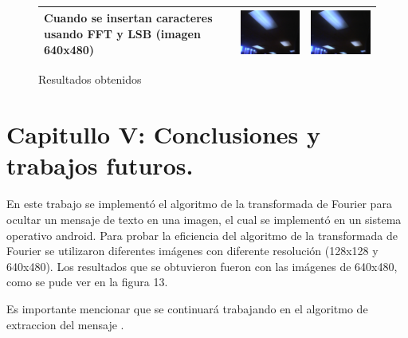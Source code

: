 \documentclass[12pt]{article}
\begin{document}
\begin{figure}[hbtp]
\begin{tabular}{|p{3cm}|c|c|}
\hline
Cuando se insertan caracteres usando FFT y LSB (imagen 640x480) & \includegraphics[width = 5cm]{psps0.png} & \includegraphics[width = 5cm]{psps1.png} \\
\hline
\end{tabular}
\caption{Resultados obtenidos}
\end{figure}
\newpage
\section{Capitullo V: Conclusiones y trabajos futuros.}
En este trabajo se implementó el algoritmo de la transformada de Fourier para ocultar un mensaje de texto en una imagen, el cual se implementó en un sistema operativo android.
Para probar la eficiencia del algoritmo de la transformada de Fourier se utilizaron diferentes imágenes con diferente resolución (128x128 y 640x480). Los resultados que se obtuvieron fueron con las imágenes de 640x480, como se pude ver en la figura 13.

Es importante mencionar que se continuará trabajando en el algoritmo de extraccion del mensaje .
\newpage
{}

\end{document}
